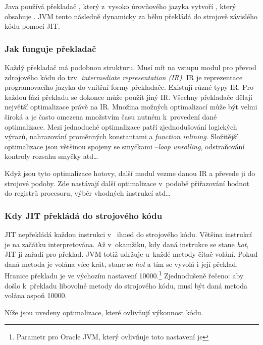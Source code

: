 Java používá překladač \javac{}, který z~vysoko úrovňového jazyka vytvoří \classfile{}, který obsahuje \bytecode{}. JVM tento \bytecode{} následně dynamicky za běhu překládá do strojově závislého kódu pomocí JIT.

\subsubsection{Jak funguje překladač}
Každý překladač má podobnou strukturu.
Musí mít na vstupu modul pro převod zdrojového kódu do tzv. \emph{intermediate representation (IR)}.
IR je reprezentace programovacího jazyka do vnitřní formy překladače.
Existují různé typy IR. Pro každou fázi překladu se dokonce může použít jiný IR.
Všechny překladače dělají největší optimalizace právě na IR.
Množina možných optimalizací může být velmi široká a je často omezena množstvím času nutném k~provedení dané optimalizace.
Mezi jednoduché optimalizace patří zjednodušování logických výrazů, nahrazování proměnných konstantami a \emph{function inlining}.
Složitější optimalizace jsou většinou spojeny se smyčkami --\emph{loop unrolling}, odstraňování kontroly rozsahu smyčky atd\ldots{}

Když jsou tyto optimalizace hotovy, další modul vezme danou IR a převede ji do strojové podoby. Zde nastávají další optimalizace v~podobě přiřazování hodnot do registrů procesoru, výběr vhodných instrukcí atd\ldots{}

\subsubsection{Kdy JIT překládá do strojového kódu\label{subsub:whenJIT}}
JIT nepřekládá každou instrukci v~\bytecode{} ihned do strojového kódu. Většina instrukcí je na začátku interpretována. Až v~okamžiku, kdy daná instrukce se stane \emph{hot}, JIT ji zařadí pro překlad. JVM totiž udržuje u~každé metody čítač volání. Pokud daná metoda je volána více krát, stane se \emph{hot} a tím se vyvolá i její překlad. Hranice překladu je ve výchozím nastavení 10000.\footnote{Parametr pro Oracle JVM, který ovlivňuje toto nastavení je } Zjednodušeně řečeno: aby došlo k~překladu libovolné metody do strojového kódu, musí být daná metoda volána aspoň 10000.

Níže jsou uvedeny optimalizace, které ovlivňují výkonnost kódu.

